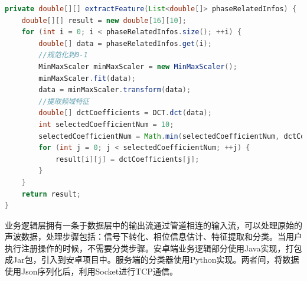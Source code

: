 
\begin{lstlisting}[language={Java}, caption={特征提取 \label{src:feature-extraction}} ]
private double[][] extractFeature(List<double[]> phaseRelatedInfos) {
    double[][] result = new double[16][10];
    for (int i = 0; i < phaseRelatedInfos.size(); ++i) {
        double[] data = phaseRelatedInfos.get(i);
        //规范化到0-1
        MinMaxScaler minMaxScaler = new MinMaxScaler();
        minMaxScaler.fit(data);
        data = minMaxScaler.transform(data);
        //提取频域特征
        double[] dctCoefficients = DCT.dct(data);
        int selectedCoefficientNum = 10;
        selectedCoefficientNum = Math.min(selectedCoefficientNum, dctCoefficients.length);
        for (int j = 0; j < selectedCoefficientNum; ++j) {
            result[i][j] = dctCoefficients[j];
        }
    }
    return result;
}
\end{lstlisting}

业务逻辑层拥有一条于数据层中的输出流通过管道相连的输入流，可以处理原始的声波数据，处理步骤包括：信号下转化、相位信息估计、特征提取和分类。当用户执行注册操作的时候，不需要分类步骤。安卓端业务逻辑部分使用Java实现，打包成Jar包，引入到安卓项目中。服务端的分类器使用Python实现。两者间，将数据使用Json序列化后，利用Socket进行TCP通信。

